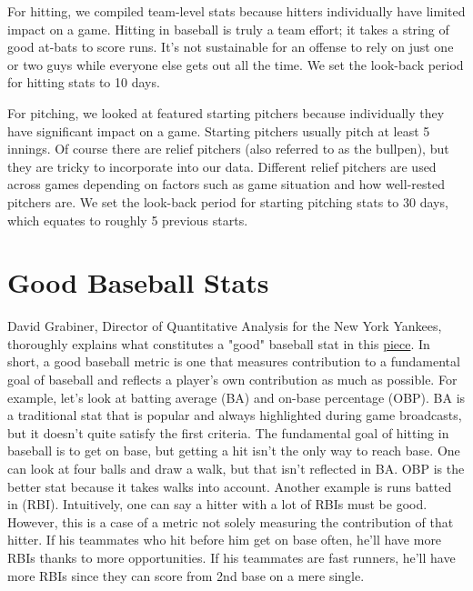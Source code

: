 \documentclass[12pt,onecolumn]{article}
\begin{document}
For hitting, we compiled team-level stats because hitters individually have limited impact on a game. Hitting in baseball is truly a team effort; it takes a string of good at-bats to score runs. It's not sustainable for an offense to rely on just one or two guys while everyone else gets out all the time. We set the look-back period for hitting stats to 10 days.

For pitching, we looked at featured starting pitchers because individually they have significant impact on a game. Starting pitchers usually pitch at least 5 innings. Of course there are relief pitchers (also referred to as the bullpen), but they are tricky to incorporate into our data. Different relief pitchers are used across games depending on factors such as game situation and how well-rested pitchers are. We set the look-back period for starting pitching stats to 30 days, which equates to roughly 5 previous starts.

\section*{Good Baseball Stats}
David Grabiner, Director of Quantitative Analysis for the New York Yankees, thoroughly explains what constitutes a "good" baseball stat in this \href{http://www.seanlahman.com/baseball-archive/sabermetrics/sabermetric-manifesto/}{piece}. In short, a good baseball metric is one that measures contribution to a fundamental goal of baseball and reflects a player's own contribution as much as possible. For example, let's look at batting average (BA) and on-base percentage (OBP). BA is a traditional stat that is popular and always highlighted during game broadcasts, but it doesn't quite satisfy the first criteria. The fundamental goal of hitting in baseball is to get on base, but getting a hit isn't the only way to reach base. One can look at four balls and draw a walk, but that isn't reflected in BA. OBP is the better stat because it takes walks into account. Another example is runs batted in (RBI). Intuitively, one can say a hitter with a lot of RBIs must be good. However, this is a case of a metric not solely measuring the contribution of that hitter. If his teammates who hit before him get on base often, he'll have more RBIs thanks to more opportunities. If his teammates are fast runners, he'll have more RBIs since they can score from 2nd base on a mere single.
\end{document}
